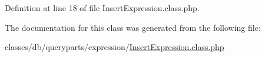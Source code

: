 Definition at line 18 of file Insert\-Expression.\-class.\-php.



The documentation for this class was generated from the following file\-:\begin{DoxyCompactItemize}
\item 
classes/db/queryparts/expression/\hyperlink{InsertExpression_8class_8php}{Insert\-Expression.\-class.\-php}\end{DoxyCompactItemize}

